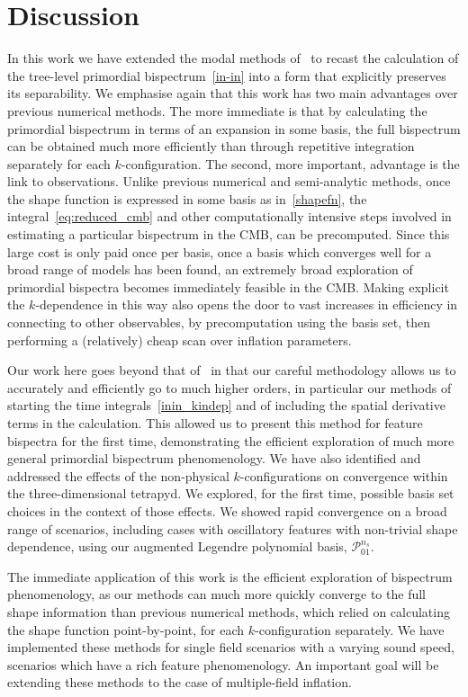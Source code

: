 \documentclass[a4paper,12pt]{extarticle}
\newcommand{\Lnsboth}{\mathcal{P}^{n_s}_{01}}
\begin{document}
\section{Discussion}\label{sec:future}
In this work we have extended the modal methods of~\cite{FergShell_1,FergShell_2,FergShell_3}
to recast the calculation of the tree-level primordial bispectrum~\eqref{in-in}
into a form that explicitly preserves its separability.
We emphasise again that this work has two main advantages over previous
numerical methods. The more immediate is that by calculating the primordial
bispectrum in terms of an expansion in some basis, the full bispectrum can
be obtained much more efficiently than through repetitive integration
separately for each $k$-configuration. The second, more important, advantage
is the link to observations.
Unlike previous numerical and semi-analytic methods,
once the shape function is expressed in some basis
as in~\eqref{shapefn},
the integral~\eqref{eq:reduced_cmb} and other computationally intensive steps involved
in estimating a particular bispectrum in the CMB, can be precomputed. Since this
large cost is only paid once per basis, once a basis
which converges well for a broad range of models
has been found, an extremely broad exploration of primordial bispectra becomes immediately feasible in the CMB.
Making explicit the $k$-dependence in this way also opens the door to vast increases in efficiency in
connecting to other observables, by precomputation using the basis set, then performing a (relatively) cheap
scan over inflation parameters.


Our work here goes beyond that of~\cite{Funakoshi} in that our careful methodology
allows us to accurately and efficiently go to much higher orders,
in particular our methods of starting the time integrals~\eqref{inin_kindep}
and of including the spatial derivative terms in the calculation.
This allowed us to present this method for feature bispectra for the first time,
demonstrating the efficient exploration of much more general primordial bispectrum phenomenology.
We have also identified and addressed the effects
of the non-physical $k$-configurations on convergence within the three-dimensional tetrapyd.
We explored, for the first time, possible basis set choices in the context
of those effects.
We showed rapid convergence on a broad range of scenarios,
including cases with oscillatory features with non-trivial shape dependence,
using our augmented Legendre polynomial basis, $\Lnsboth$.

The immediate application of this work is the efficient exploration of
bispectrum phenomenology, as our methods can much more quickly
converge to the full shape information than previous numerical methods,
which relied on calculating the shape function point-by-point, for each $k$-configuration separately.
We have implemented these methods for single field scenarios
with a varying sound speed, scenarios which
have a rich feature phenomenology. An important goal will be extending
these methods to the case of multiple-field inflation.
\end{document}
